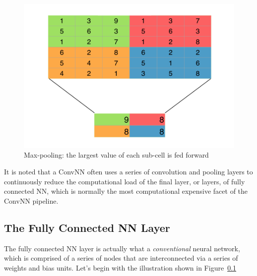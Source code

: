 \documentclass[letterpaper,12pt]{article}
\newcommand{\figref}[1]{Figure~\ref{#1}}
\begin{document}
\begin{figure}[htbp]
\begin{center}
\includegraphics[scale=0.5]{images/maxpool.png}
\caption{Max-pooling: the largest value of each sub-cell is fed forward}
\label{conv}
\end{center}
\end{figure}

It is noted that a ConvNN often uses a series of convolution and pooling layers to continuously reduce the computational load of the final layer, or layers, of fully connected NN, which is normally the most computational expensive facet of the ConvNN pipeline. 

\subsection{The Fully Connected NN Layer}

The fully connected NN layer is actually what a \textit{conventional} neural network, which is comprised of a series of nodes that are interconnected via a series of weights and bias units. Let's begin with the illustration shown in \figref{}
\end{document}
